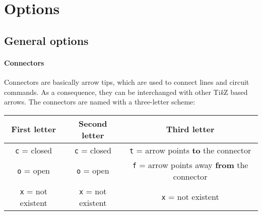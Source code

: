 \documentclass[a4]{article}
\newcommand*\Tikz{\textup{Ti\textit kZ}\xspace}
\begin{document}
\section{Options}
\subsection{General options}
\paragraph{Connectors}
Connectors are basically arrow tips, which are used to connect lines and circuit commands. As a consequence, they can be interchanged with other \Tikz based arrows. The connectors are named with a three-letter scheme:%
\begin{table}[h]
\centering
\begin{tabular}{ccc}
First letter & Second letter & Third letter \\
\midrule
\verb+c+ = closed & \verb+c+ = closed & \verb+t+ = arrow points \textbf{to} the connector\\
\verb+o+ = open & \verb+o+ = open& \verb+f+ = arrow points away \textbf{from} the connector\\
\verb+x+ = not existent& \verb+x+ = not existent & \verb+x+ = not existent \\
\end{tabular}
\label{tab:connectornamingscheme}
\end{table}
\end{document}
